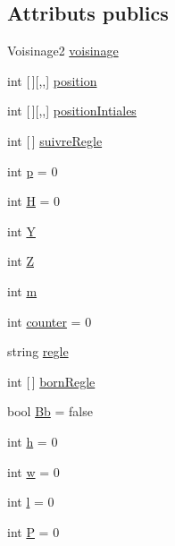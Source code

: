 \subsection*{Attributs publics}
\begin{DoxyCompactItemize}
\item 
Voisinage2 \mbox{\hyperlink{class_local_storage_a7c3473a8ec5d422f95955875319acb8d}{voisinage}}
\item 
int \mbox{[}$\,$\mbox{]}\mbox{[},,\mbox{]} \mbox{\hyperlink{class_local_storage_a135431eb0ae788b698b206b3cf12130d}{position}}
\item 
int \mbox{[}$\,$\mbox{]}\mbox{[},,\mbox{]} \mbox{\hyperlink{class_local_storage_ac396dd43ace1f6497cdf099e14475921}{position\+Intiales}}
\item 
int \mbox{[}$\,$\mbox{]} \mbox{\hyperlink{class_local_storage_a44b63fd921b38784a7055d5d2f115ffd}{suivre\+Regle}}
\item 
int \mbox{\hyperlink{class_local_storage_afd19ccbc719dd24bc66d271ca12f9917}{p}} = 0
\item 
int \mbox{\hyperlink{class_local_storage_ab55c19c1538c44a375aba42a518db233}{H}} = 0
\item 
int \mbox{\hyperlink{class_local_storage_af57f31509b004adeedf1b2df90f3a57b}{Y}}
\item 
int \mbox{\hyperlink{class_local_storage_a815d0b2c4b2cfc16fdfbbd5d2c7198bf}{Z}}
\item 
int \mbox{\hyperlink{class_local_storage_aa0b0024033d7e584459a0f278c1214c7}{m}}
\item 
int \mbox{\hyperlink{class_local_storage_a0e0c067f1347bf30ce06b9a3da2ce1f4}{counter}} = 0
\item 
string \mbox{\hyperlink{class_local_storage_a87f119194a8416674899540e1457d3f1}{regle}}
\item 
int \mbox{[}$\,$\mbox{]} \mbox{\hyperlink{class_local_storage_ae6bc493dae6af4907a7a406e0b8b382c}{born\+Regle}}
\item 
bool \mbox{\hyperlink{class_local_storage_aa9eacf4614847e9fa89306018c36457a}{Bb}} = false
\item 
int \mbox{\hyperlink{class_local_storage_ab025e3ab66a812167b739de8f636e72f}{h}} = 0
\item 
int \mbox{\hyperlink{class_local_storage_abac4c0cb7803f4f4438aba6a02a9eba2}{w}} = 0
\item 
int \mbox{\hyperlink{class_local_storage_a37e93f37b061a398e9d3cbfaf4c7fecd}{l}} = 0
\item 
int \mbox{\hyperlink{class_local_storage_a6ec9529fe0a479acbf1275d5bbcdeefb}{P}} = 0
\end{DoxyCompactItemize}


